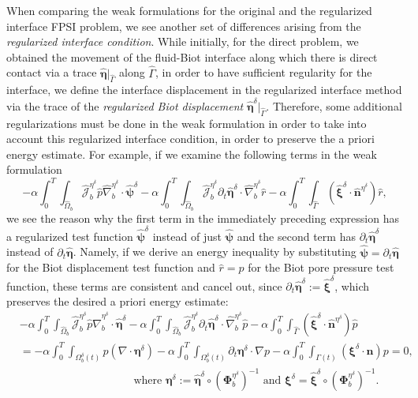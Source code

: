 \documentclass[11pt]{article}
\newcommand{\bd}{\boldsymbol}
\theoremstyle{definition}
\begin{document}
When comparing the weak formulations for the original and the regularized interface FPSI problem, we see another set of differences arising from the \textit{regularized interface condition}. While initially, for the direct problem, we obtained the movement of the fluid-Biot interface along which there is direct contact via a trace $\hat{\bd{\eta}}|_{\hat{\Gamma}}$ along $\hat{\Gamma}$, in order to have sufficient regularity for the interface, we define the interface displacement in the regularized interface method via the trace of the \textit{regularized Biot displacement} $\hat{\bd{\eta}}^{\delta}|_{\hat{\Gamma}}$. Therefore, some additional regularizations must be done in the weak formulation in order to take into account this regularized interface condition, in order to preserve the a priori energy estimate. For example, if we examine the following terms in the weak formulation
\begin{equation*}
-\alpha \int_{0}^{T} \int_{\hat{\Omega}_{b}} \hat{\mathcal{J}}^{\eta^{\delta}}_{b} \hat{p} \hat{\nabla}^{\eta^{\delta}}_{b} \cdot \hat{\bd{\psi}}^{\delta} - \alpha \int_{0}^{T} \int_{\hat{\Omega}_{b}} \hat{\mathcal{J}}^{\eta^{\delta}}_{b} \partial_{t} \hat{\bd{\eta}}^{\delta} \cdot \hat{\nabla}^{\eta^{\delta}}_{b} \hat{r} - \alpha \int_{0}^{T} \int_{\hat{\Gamma}} (\hat{\bd{\xi}}^{\delta} \cdot \hat{\bd{n}}^{\eta^{\delta}}) \hat{r},
\end{equation*}
we see the reason why the first term in the immediately preceding expression has a regularized test function $\hat{\bd{\psi}}^{\delta}$ instead of just $\hat{\bd{\psi}}$ and the second term has $\partial_{t}\hat{\bd{\eta}}^{\delta}$ instead of $\partial_{t} \hat{\bd{\eta}}$. Namely, if we derive an energy inequality by substituting $\hat{\bd{\psi}} = \partial_{t} \hat{\bd{\eta}}$ for the Biot displacement test function and $\hat{r} = \hat{p}$ for the Biot pore pressure test function, these terms are consistent and cancel out, since $\partial_{t}\hat{\bd{\eta}}^{\delta} := \hat{\bd{\xi}}^{\delta}$, which preserves the desired a priori energy estimate:
\begin{align*}
&-\alpha \int_{0}^{T} \int_{\hat{\Omega}_{b}} \hat{\mathcal{J}}^{\eta^{\delta}}_{b} \hat{p} \hat{\nabla}^{\eta^{\delta}}_{b} \cdot \hat{\bd{\eta}}^{\delta} - \alpha \int_{0}^{T} \int_{\hat{\Omega}_{b}} \hat{\mathcal{J}}^{\eta^{\delta}}_{b} \partial_{t} \hat{\bd{\eta}}^{\delta} \cdot \hat{\nabla}^{\eta^{\delta}}_{b} \hat{p} - \alpha \int_{0}^{T} \int_{\hat{\Gamma}} (\hat{\bd{\xi}}^{\delta} \cdot \hat{\bd{n}}^{\eta^{\delta}}) \hat{p} \\
&= -\alpha \int_{0}^{T} \int_{\Omega^{\delta}_{b}(t)} p (\nabla \cdot \bd{\eta}^{\delta}) - \alpha \int_{0}^{T} \int_{\Omega^{\delta}_{b}(t)} \partial_{t} \bd{\eta}^{\delta} \cdot \nabla p - \alpha \int_{0}^{T} \int_{\Gamma(t)} (\bd{\xi}^{\delta} \cdot \bd{n}) p = 0, \\
&\qquad \qquad \qquad \qquad \qquad \text{ where } \bd{\eta}^{\delta} := \hat{\bd{\eta}}^{\delta} \circ (\bd{\Phi}^{\eta^{\delta}}_{b})^{-1} \text{ and } \bd{\xi}^{\delta} = \hat{\bd{\xi}}^{\delta} \circ (\bd{\Phi}^{\eta^{\delta}}_{b})^{-1}.
\end{align*}
\end{document}
